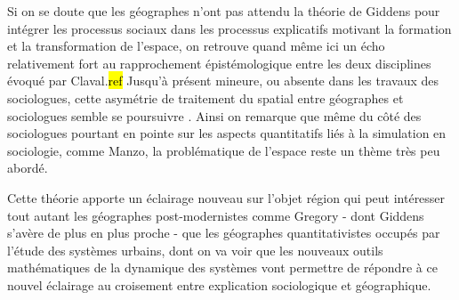 
Si on se doute que les géographes n'ont pas attendu la théorie de Giddens pour intégrer les processus sociaux dans les processus explicatifs motivant la formation et la transformation de l'espace, on retrouve quand même ici un écho relativement fort au rapprochement épistémologique entre les deux disciplines évoqué par Claval.\hl{ref} Jusqu'à présent mineure, ou absente dans les travaux des sociologues, cette asymétrie de traitement du spatial entre géographes et sociologues semble se poursuivre \autocite{Rhein2003}. Ainsi on remarque que même du côté des sociologues pourtant en pointe sur les aspects quantitatifs liés à la simulation en sociologie, comme Manzo, la problématique de l'espace reste un thème très peu abordé.


Cette théorie apporte un éclairage nouveau sur l'objet région qui peut intéresser tout autant les géographes post-modernistes comme Gregory - dont Giddens s'avère de plus en plus proche - que les géographes quantitativistes occupés par l'étude des systèmes urbains, dont on va voir que les nouveaux outils mathématiques de la dynamique des systèmes vont permettre de répondre à ce nouvel éclairage au croisement entre explication sociologique et géographique.




